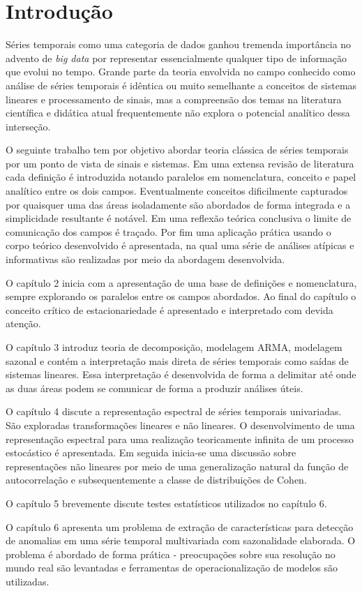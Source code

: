 \chapter{Introdução}
\label{cap:introducao}

Séries temporais como uma categoria de dados ganhou tremenda importância no
advento de \emph{big data} por representar essencialmente qualquer tipo de
informação que evolui no tempo. Grande parte da teoria envolvida no campo
conhecido como análise de séries temporais é idêntica ou muito semelhante a
conceitos de sistemas lineares e processamento de sinais, mas a compreensão dos
temas na literatura científica e didática atual frequentemente não explora o
potencial analítico dessa interseção.

O seguinte trabalho tem por objetivo abordar teoria clássica de séries
temporais por um ponto de vista de sinais e sistemas. Em uma extensa revisão de
literatura cada definição é introduzida notando paralelos em nomenclatura,
conceito e papel analítico entre os dois campos. Eventualmente conceitos
dificilmente capturados por quaisquer uma das áreas isoladamente são abordados
de forma integrada e a simplicidade resultante é notável. Em uma reflexão
teórica conclusiva o limite de comunicação dos campos é traçado. Por fim uma
aplicação prática usando o corpo teórico desenvolvido é apresentada, na qual
uma série de análises atípicas e informativas são realizadas por meio da
abordagem desenvolvida.

O capítulo 2 inicia com a apresentação de uma base de definições e
nomenclatura, sempre explorando os paralelos entre os campos abordados. Ao
final do capítulo o conceito crítico de estacionariedade é apresentado e
interpretado com devida atenção.

O capítulo 3 introduz teoria de decomposição, modelagem ARMA, modelagem sazonal
e contém a interpretação mais direta de séries temporais como saídas de
sistemas lineares. Essa interpretação é desenvolvida de forma a delimitar até
onde as duas áreas podem se comunicar de forma a produzir análises úteis.

O capítulo 4 discute a representação espectral de séries temporais univariadas.
São exploradas transformações lineares e não lineares. O desenvolvimento de uma
representação espectral para uma realização teoricamente infinita de um
processo estocástico é apresentada. Em seguida inicia-se uma discussão sobre
representações não lineares por meio de uma generalização natural da função de
autocorrelação e subsequentemente a classe de distribuições de Cohen.

O capítulo 5 brevemente discute testes estatísticos utilizados no capítulo 6.

O capítulo 6 apresenta um problema de extração de características para detecção
de anomalias em uma série temporal multivariada com sazonalidade elaborada. O
problema é abordado de forma prática - preocupações sobre sua resolução no
mundo real são levantadas e ferramentas de operacionalização de modelos são
utilizadas.
